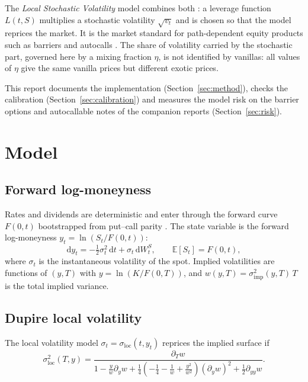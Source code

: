 \documentclass[11pt,a4paper]{article}
\newcommand{\E}{\mathbb{E}}
\newcommand{\dd}{\mathrm{d}}
\newcommand{\sloc}{\sigma_{\mathrm{loc}}}
\begin{document}
The \emph{Local Stochastic Volatility} model combines both \cite{lipton2002,ren2007}: a leverage function $L(t,S)$
multiplies a stochastic volatility $\sqrt{v_t}$ and is chosen so that the model reprices the market. It is the
market standard for path-dependent equity products such as barriers and autocalls \cite{bergomi2016}. The share of
volatility carried by the stochastic part, governed here by a mixing fraction $\eta$, is not identified by vanillas:
all values of $\eta$ give the same vanilla prices but different exotic prices.

This report documents the implementation (Section~\ref{sec:method}), checks the calibration
(Section~\ref{sec:calibration}) and measures the model risk on the barrier options and autocallable notes of the
companion reports \cite{benguedda2026barrier,benguedda2026autocall} (Section~\ref{sec:risk}).

\section{Model}\label{sec:model}

\subsection{Forward log-moneyness}
Rates and dividends are deterministic and enter through the forward curve $F(0,t)$ bootstrapped from put--call parity
\cite{benguedda2026heston}. The state variable is the forward log-moneyness $y_t = \ln(S_t / F(0,t))$:
\begin{equation}
\dd y_t = -\tfrac12 \sigma_t^2\,\dd t + \sigma_t\,\dd W^S_t, \qquad \E[S_t] = F(0,t),
\end{equation}
where $\sigma_t$ is the instantaneous volatility of the spot. Implied volatilities are functions of $(y, T)$ with
$y = \ln(K/F(0,T))$, and $w(y, T) = \sigma_{\mathrm{imp}}^2(y,T)\,T$ is the total implied variance.

\subsection{Dupire local volatility}
The local volatility model $\sigma_t = \sloc(t, y_t)$ reprices the implied surface if \cite{dupire1994,gatheral2006}
\begin{equation}\label{eq:dupire}
\sloc^2(T, y) = \frac{\partial_T w}{1 - \frac{y}{w}\partial_y w + \frac14\left(-\frac14 - \frac1w + \frac{y^2}{w^2}\right)(\partial_y w)^2 + \frac12 \partial_{yy} w}.
\end{equation}
\end{document}
